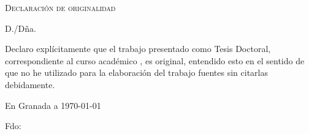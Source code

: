 %

\thispagestyle{empty}

\hfill\vfill

\textsc{Declaración de originalidad}\\\bigskip

D./Dña. \miNombre \\\medskip

Declaro explícitamente que el trabajo presentado como Tesis Doctoral, correspondiente al curso académico \miCurso, es original, entendido esto en el sentido de que no he utilizado para la elaboración del trabajo fuentes sin citarlas debidamente.
\medskip

En Granada a \today 
\vspace{3cm}
\begin{center} 
Fdo: \miNombre 

\end{center}

\vfill

\cleardoublepage
\endinput
